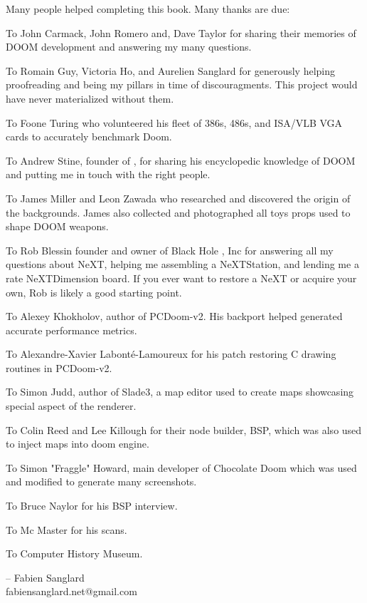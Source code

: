 Many people helped completing this book. Many thanks are due:\\
\par
To John Carmack, John Romero and, Dave Taylor for sharing their memories of DOOM development and answering my many questions.\\
\par
To Romain Guy, Victoria Ho, and Aurelien Sanglard for generously helping proofreading and being my pillars in time of discouragments. This project would have never materialized without them.\\ 
\par
To Foone Turing who volunteered his fleet of 386s, 486s, and ISA/VLB VGA cards to accurately benchmark Doom.\\
\par
To Andrew Stine, founder of , for sharing his encyclopedic knowledge of DOOM and putting me in touch with the right people.\\
\par
To James Miller and Leon Zawada who researched and discovered the origin of the backgrounds. James also collected and photographed all toys props used to shape DOOM weapons.\\
\par
To Rob Blessin founder and owner of Black Hole , Inc for answering all my questions about NeXT, helping me assembling a NeXTStation, and lending me a rate NeXTDimension board. If you ever want to restore a NeXT or acquire your own, Rob is likely a good starting point.\\
\par
To Alexey Khokholov, author of PCDoom-v2. His backport helped generated accurate performance metrics.\\
\par
To Alexandre-Xavier Labont\'e-Lamoureux for his patch restoring C drawing routines in PCDoom-v2.\\
\par
To Simon Judd, author of Slade3, a map editor used to create maps showcasing special aspect of the renderer.\\
\par
To Colin Reed and Lee Killough for their node builder, BSP, which was also used to inject maps into doom engine.\\
\par
To Simon "Fraggle" Howard, main developer of Chocolate Doom which was used and modified to generate many screenshots.\\
\par
To Bruce Naylor for his BSP interview.\\
\par
To Mc Master for his scans.\\
\par
To Computer History Museum.\\
\par

-- Fabien Sanglard\\
fabiensanglard.net@gmail.com
